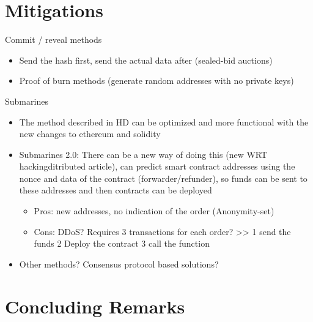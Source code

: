 \section{Mitigations}

Commit / reveal methods %
\begin{itemize}
\item{Send the hash first, send the actual data after (sealed-bid auctions)}
\item{Proof of burn methods (generate random addresses with no private keys)}
\end{itemize}
Submarines
\begin{itemize}
\item{The method described in HD can be optimized and more functional with the new changes to ethereum and solidity}
\item{Submarines 2.0: There can be a new way of doing this (new WRT hackingditributed article), can predict smart contract addresses using the nonce and data of the contract (forwarder/refunder), so funds can be sent to these addresses and then contracts can be deployed} 
\begin {itemize}
\item{Pros: new addresses, no indication of the order (Anonymity-set)}
\item{Cons: DDoS? Requires 3 transactions for each order?} >> 1 send the funds 2 Deploy the contract 3 call the function
\end{itemize}
\item{Other methods? Consensus protocol based solutions?}

\end{itemize}

\section{Concluding Remarks}


 

































